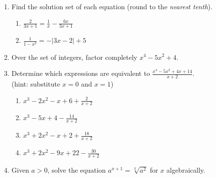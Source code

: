 \documentclass[12pt, twoside]{article}
\begin{document}
\begin{enumerate}[itemsep=0.5cm]
\item Find the solution set of each equation (round to the \emph{nearest tenth}).
\begin{multicols}{2}
    \begin{enumerate}
        \item $\displaystyle \frac{2}{3x+1} = \frac{1}{x} - \frac{6x}{3x+1}$
        \item $\displaystyle \frac{1}{1-x^2} = - |3x-2|+5$
    \end{enumerate}
\end{multicols}

\newpage
\item Over the set of integers, factor completely $x^4-5x^2+4$. \vspace{3cm} %

\item Determine which expressions are equivalent to $\displaystyle \frac{x^4-5x^2+4x+14}{x+2}$. \\[0.25cm]
    (hint: substitute $x=0$ and $x=1$)
    \begin{multicols}{2}
    \begin{enumerate}[itemsep=2cm]
        \item $\displaystyle x^3-2x^2-x+6+\frac{2}{x+2}$
        \item $\displaystyle x^3-5x+4-\frac{14}{x+2}$
        \item $\displaystyle x^3+2x^2-x+2+\frac{18}{x+2}$
        \item $\displaystyle x^3+2x^2-9x+22-\frac{30}{x+2}$
    \end{enumerate}
    \end{multicols} \vspace{2cm}

\item Given $a > 0$, solve the equation $a^{x+1} = \sqrt[3]{a^2}$ for $x$ algebraically. %
\vspace{2cm}

\newpage

\end{enumerate}
\end{document}
